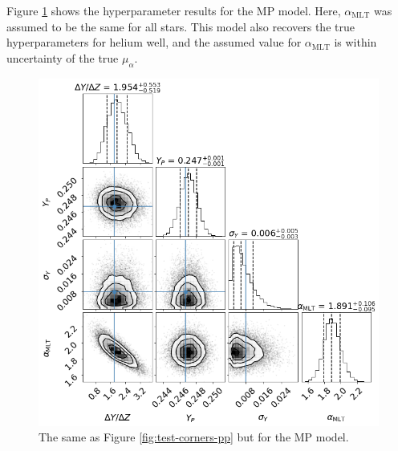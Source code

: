\documentclass[a4paper,fleqn,usenatbib]{mnras}
\newcommand{\mlt}{\ensuremath{{\alpha_\mathrm{MLT}}}}
\begin{document}
Figure \ref{fig:test-corners-mp} shows the hyperparameter results for the MP model. Here, $\mlt$ was assumed to be the same for all stars. This model also recovers the true hyperparameters for helium well, and the assumed value for $\mlt$ is within uncertainty of the true $\mu_\alpha$.

\begin{figure}
    \centering
    \includegraphics[width=\linewidth]{figures/corner_plot_mp_truths.png}
    \caption{The same as Figure \ref{fig:test-corners-pp} but for the MP model.}
    \label{fig:test-corners-mp} 
\end{figure}

\end{document}
